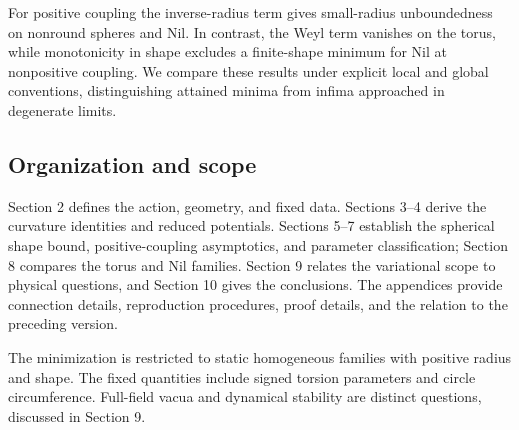For positive coupling the inverse-radius term gives small-radius
unboundedness on nonround spheres and Nil. In contrast, the Weyl term
vanishes on the torus, while monotonicity in shape excludes a finite-shape
minimum for Nil at nonpositive coupling. We compare these results under
explicit local and global conventions, distinguishing attained minima
from infima approached in degenerate limits.

\subsection{Organization and scope}
Section 2 defines the action, geometry, and fixed data. Sections 3--4
derive the curvature identities and reduced potentials. Sections 5--7
establish the spherical shape bound, positive-coupling asymptotics, and
parameter classification; Section 8 compares the torus and Nil families.
Section 9 relates the variational scope to physical questions, and
Section 10 gives the conclusions. The appendices provide connection
details, reproduction procedures, proof details, and the relation to
the preceding version.

The minimization is restricted to static homogeneous families with
positive radius and shape. The fixed quantities include signed torsion
parameters and circle circumference. Full-field vacua and dynamical
stability are distinct questions, discussed in Section 9.
